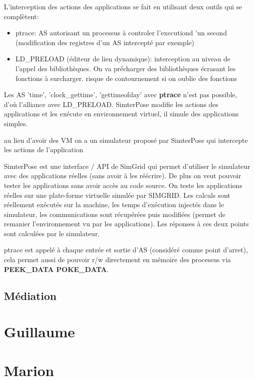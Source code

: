 \documentclass{article}
\begin{document}
L'interception des actions des applications se fait en utilisant deux outils qui
se complètent:
\begin{itemize}
\item ptrace: AS autorisant un processus à controler l'executiond 'un second
  (modification des registres d'un AS intercepté par exemple)
\item LD\_PRELOAD (éditeur de lien dynamique): interception au niveau de l'appel
  des bibliothèques. On va précharger des bibliothèques écrasant les fonctions à
  surcharger. {\color{red} risque de contournement si on oublie des fonctions}
\end{itemize}

Les AS 'time', 'clock\_gettime', 'gettimeofday' avec \textbf{ptrace} n'est pas
possible, d'où l'alliance avec LD\_PRELOAD.  SimterPose modifie les actions des
applications et les exécute en environnement virtuel, il simule des applications
simples.

{\color{green} au lieu d'avoir des VM on a un simulateur proposé par SimterPose
  qui intercepte les actions de l'application}

SimterPose est une interface / API de SimGrid qui permet d'utiliser le
simulateur avec des applications réelles (sans avoir à les réécrire). De plus on
veut pouvoir tester les applications sans avoir accès au code source. On teste
les applications réelles sur une plate-forme virtuelle simulée par SIMGRID. Les
calculs sont réellement exécutés sur la machine, les temps d'exécution injectés
dans le simulateur, les communications sont récupérées puis modifiées (permet de
remanier l'environnement vu par les applications). Les réponses à ces deux
points sont calculées par le simulateur.

ptrace est appelé à chaque entrée et sortie d'AS (considéré comme point
d'arret), cela permet aussi de pouvoir r/w directement en mémoire des processus
via \textbf{PEEK\_DATA POKE\_DATA}.

\subsection{Médiation}

\section{Guillaume}

\section{Marion}
\end{document}
